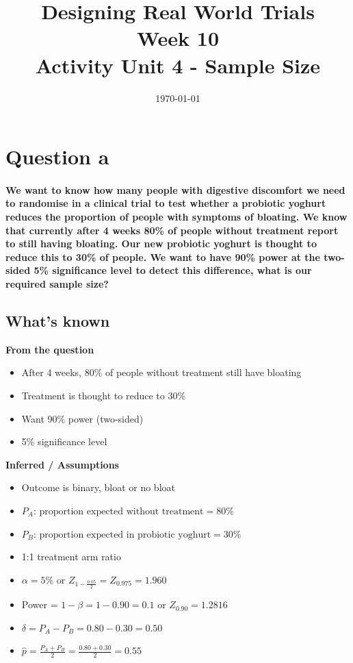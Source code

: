 \documentclass{article}
\title{Designing Real World Trials\\Week 10\\Activity Unit 4 - Sample Size}
\date{\today}
\begin{document}
\maketitle

\section*{Question a}
\paragraph{We want to know how many people with digestive discomfort we need to randomise in a clinical trial to test
whether a probiotic yoghurt reduces the proportion of people with symptoms of bloating. We know that currently
after 4 weeks 80\% of people without treatment report to still having bloating. Our new probiotic yoghurt is thought
to reduce this to 30\% of people. We want to have 90\% power at the two-sided 5\% significance level to detect this
difference, what is our required sample size?}

\subsection*{What's known}
\textbf{From the question}
\begin{itemize}
    \item After 4 weeks, 80\% of people without treatment still have bloating
    \item Treatment is thought to reduce to 30\%
    \item Want 90\% power (two-sided)
    \item 5\% significance level
\end{itemize}

\textbf{Inferred / Assumptions}
\begin{itemize}
    \item Outcome is binary, bloat or no bloat
    \item $P_A \text{: proportion expected without treatment} = 80\%$
    \item $P_B \text{: proportion expected in probiotic yoghurt} = 30\%$
    \item 1:1 treatment arm ratio
    \item $\alpha = 5\%$ or $Z_{1 - \frac{0.05}{2}} = Z_{0.975} = 1.960$
    \item Power = $1 - \beta = 1 - 0.90 = 0.1$ or $Z_{0.90} = 1.2816$
    \item $\delta = P_A - P_B = 0.80 - 0.30 = 0.50$
    \item $\hat{p} = \frac{P_A + P_B}{2} = \frac{0.80 + 0.30}{2} = 0.55$
\end{itemize}
\end{document}
